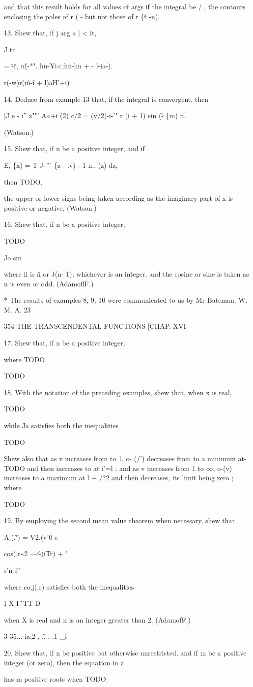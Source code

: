 and that this result holds for all values of args if the integral be /
, the contours enclosing the poles of r ( - but not those of r \{\^t
-n).

13. Shew that, if j arg a | < it,

J tc

= \^-\^ r, n\^(-*". hn-¥i<;hn-hn + - l-ia-).

r(-w)r(\^m-\^i + l)aH'+i)

14. Deduce from example 13 that, if the integral is convergent, then

|J e - i'' z""' A«+i (2) c/2 = (v/2)-i-'" r (i + 1) sin (\^ - \{m) n.

(Watson.)

15. Shew that, if n be a positive integer, and if

E, \{x) = T J- \^'' \{z - .v) - 1 n,, (z) dz,

then TODO.

the upper or lower signs being taken according as the imaginary part
of x is positive or negative. (Watson.)

16. Shew that, if n be a positive integer,

TODO

Jo sm

where fi is \^n or J(n- 1), whichever is an integer, and the cosine or
sine is taken as n is even or odd. (AdamoflF.)

* The results of examples 8, 9, 10 were communicated to us by Mr
Bateman. W. M. A. 23

354 THE TRANSCENDENTAL FUNCTIONS [CHAP. XVI

17. Shew that, if n be a positive integer,

where TODO

TODO 

18. With the notation of the preceding examples, shew that, when x is
real,

TODO

while Ja satisfies both the inequalities

TODO

Shew also that as v increases from to 1, o- (/') decreases from to a
minimum at- TODO and then increases to at i'=l ; and as v increases
from 1 to $\infty$, o-(v) increases to a maximum at l + /?2 and then
decreases, its limit being zero ; where

TODO 

19. By employing the second mean value theorem when necessary, shew
that

A.(.\^') = V2.(v'0 e

cos(.r«2 —:\^-)iTr) + '

s'n J'

where co,j(.r) satisfies both the inequalities

I X I \^'TT D

when X is real and n is an integer greater than 2. (AdamofF.)

3-35... ia;2 , ,\^, , .1 \_i

20. Shew that, if n be positive but otherwise unrestricted, and if m
be a positive integer (or zero), then the equation in z

has m positive roots when TODO. 